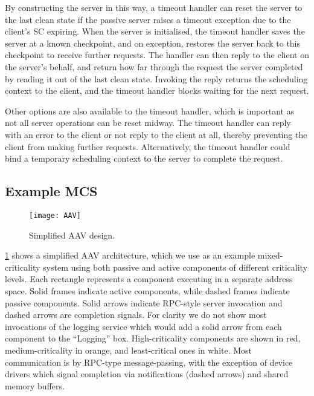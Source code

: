 By constructing the server in this way, a timeout handler can reset the server to the last clean
state if the passive server raises a timeout exception due to the client's \gls{SC} expiring. 
When the server is initialised, the timeout handler saves the server at a known checkpoint, and on
exception, restores the server back to this checkpoint to receive further requests.
The handler can then reply to the client on the server's behalf, and return how
far through the request the server completed by reading it out of the last clean state. Invoking the
reply returns the scheduling context to the client, and the timeout handler blocks waiting for the
next request.

Other options are also available to the timeout handler, which is important as not all server
operations can be reset midway. The timeout handler can reply with an error to the client or  
not reply to the client at all, thereby preventing the client from making further requests.
Alternatively, the timeout handler could  
bind a temporary scheduling context to the server to complete the request. 

\subsection{Example MCS}

\begin{figure}[b]                                                                      
  \centering                                                                          
  \texttt{[image: AAV]}                                           
  \caption{Simplified AAV design.}                  
  \label{f:aav}                                                                       
\end{figure}                                                                          

\cref{f:aav} shows a simplified AAV architecture, which we use as an example
mixed-criticality system using both passive and active components of different criticality levels.
Each rectangle represents a component executing in a separate address space. 
Solid frames indicate active components, while dashed frames indicate passive components.   Solid
arrows indicate RPC-style server invocation and dashed    
    arrows are completion signals. For clarity we do not show most                    
    invocations of the logging service which would add a solid arrow                  
    from each component to the ``Logging'' box. High-criticality                         
    components are shown in red, medium-criticality in orange, and least-critical ones in white.     
Most communication is by RPC-type message-passing, with the exception of device drivers which signal
\IO completion via notifications (dashed arrows) and shared memory buffers.

